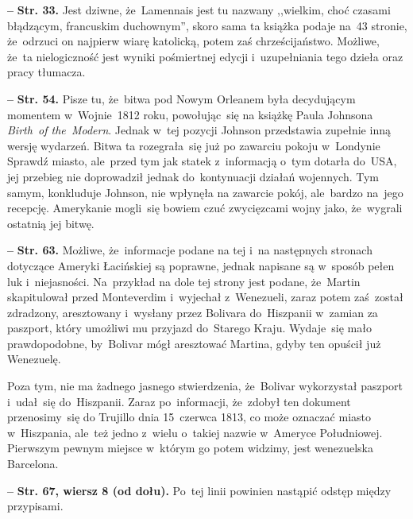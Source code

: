 \documentclass[a4paper,11pt]{article}  %
\newcommand{\spaceFour}{0.5em}
\newcommand{\tb}{\textbf}
\newcommand{\noi}{\noindent}
\newcommand{\start}{\noi \tb{--} {}}
\newcommand{\Str}[1]{\tb{Str. #1.}}
\newcommand{\StrWd}[2]{\tb{Str. #1, wiersz #2 (od dołu).}}
\newcommand{\red}[1]{{\color{red} #1}}
\begin{document}
\vspace{\spaceFour}


\start \Str{33} Jest dziwne, że~Lamennais jest tu nazwany ,,wielkim,
choć czasami błądzącym, francuskim duchownym'', skoro sama ta książka
podaje na~43 stronie, że~odrzuci on najpierw wiarę katolicką, potem
zaś chrześcijaństwo. Możliwe, że~ta nielogiczność jest wyniki
pośmiertnej edycji i~uzupełniania tego dzieła oraz pracy tłumacza.

\vspace{\spaceFour}


\start \Str{54} Pisze tu, że~bitwa pod Nowym Orleanem była decydującym
momentem w~Wojnie~1812 roku, powołując~się na książkę Paula Johnsona
\emph{Birth~of the~Modern}. Jednak w~tej pozycji Johnson przedstawia
zupełnie inną wersję wydarzeń. Bitwa ta rozegrała~się już po zawarciu
pokoju w~Londynie \red{Sprawdź miasto}, ale~przed tym jak statek
z~informacją o~tym dotarła do~USA, jej przebieg nie doprowadził jednak
do~kontynuacji działań wojennych. Tym samym, konkluduje Johnson, nie
wpłynęła na zawarcie pokój, ale~bardzo na~jego recepcję. Amerykanie
mogli~się bowiem czuć zwycięzcami wojny jako, że~wygrali ostatnią jej
bitwę.

\vspace{\spaceFour}


\start \Str{63} Możliwe, że~informacje podane na tej i~na następnych
stronach dotyczące Ameryki Łacińskiej są poprawne, jednak napisane są
w~sposób pełen luk i~niejasności. Na~przykład na dole tej strony jest
podane, że~Martin skapitulował przed Monteverdim i~wyjechał
z~Wenezueli, zaraz potem zaś~został zdradzony, aresztowany i~wysłany
przez Bolivara do~Hiszpanii w~zamian za paszport, który umożliwi mu
przyjazd do~Starego Kraju. Wydaje~się mało prawdopodobne, by~Bolivar
mógł aresztować Martina, gdyby ten opuścił już Wenezuelę.

Poza tym, nie ma żadnego jasnego stwierdzenia, że~Bolivar wykorzystał
paszport i~udał~się do~Hiszpanii. Zaraz po~informacji, że~zdobył ten
dokument przenosimy~się do Trujillo dnia 15~czerwca 1813, co może
oznaczać miasto w~Hiszpania, ale~też jedno z~wielu o~takiej nazwie
w~Ameryce Południowej. Pierwszym pewnym miejsce w~którym go potem
widzimy, jest wenezuelska Barcelona.

\vspace{\spaceFour}


\start \StrWd{67}{8} Po~tej linii powinien nastąpić odstęp między
przypisami.

\vspace{\spaceFour}
\end{document}
